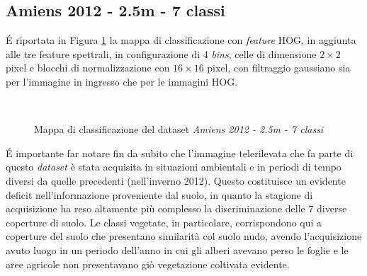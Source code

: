 \clearpage





\subsection{Amiens 2012 - 2.5m - 7 classi}

\'E riportata in Figura \ref{fig:ClassMap_Amiens2012_2_5m_noroads} la
mappa di classificazione con \emph{feature} HOG, in aggiunta alle tre
feature spettrali, in configurazione di $4$ \emph{bins}, celle di
dimensione $2\times2$ pixel e blocchi di normalizzazione con
$16\times16$ pixel, con filtraggio gaussiano sia per l'immagine in
ingresso che per le immagini HOG.

\begin{figure}[!ht]

\center

\\

\caption{Mappa di classificazione del dataset \emph{Amiens 2012 - 2.5m
- 7 classi}}

\label{fig:ClassMap_Amiens2012_2_5m_noroads}

\end{figure}

\'E importante far notare fin da subito che l'immagine telerilevata
che fa parte di questo \emph{dataset} è stata acquisita in situazioni
ambientali e in periodi di tempo diversi da quelle precedenti
(nell'inverno 2012). Questo costituisce un evidente deficit
nell'informazione proveniente dal suolo, in quanto la stagione di
acquisizione ha reso altamente più complesso la discriminazione delle
7 diverse coperture di suolo. Le classi vegetate, in particolare,
corrispondono qui a coperture del suolo che presentano similarità col
suolo nudo, avendo l'acquisizione avuto luogo in un periodo dell'anno
in cui gli alberi avevano perso le foglie e le aree agricole non
presentavano giò vegetazione coltivata evidente.\\


